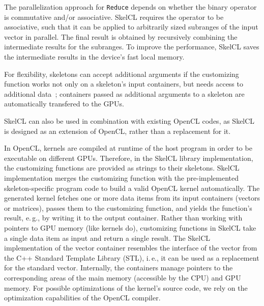 %
%
%


The parallelization approach for \texttt{Reduce} depends on whether the binary operator is commutative and/or associative.
SkelCL requires the operator to be associative, such that it can be applied to arbitrarily sized subranges of the input vector in parallel.
The final result is obtained by recursively combining the intermediate results for the subranges.
To improve the performance, SkelCL saves the intermediate results in the device's fast local memory.


For flexibility, \SkelCL skeletons can accept additional arguments if the customizing function works not only on a skeleton's input containers, but needs access to additional data~\cite{StKG-11};
containers passed as additional arguments to a skeleton are automatically transfered to the GPUs.

SkelCL can also be used in combination with existing OpenCL codes, as SkelCL is designed as an extension of OpenCL, rather than a replacement for it.


In OpenCL, kernels are compiled at runtime of the host program in order to be executable on different GPUs.
Therefore, in the SkelCL library implementation, the customizing functions are provided as strings to their skeletons.
SkelCL implementation merges the customizing function with the pre-implemented skeleton-specific program code to build a valid OpenCL kernel automatically.
The generated kernel fetches one or more data items from its input containers (vectors or matrices), passes them to the customizing function, and yields the function's result, e.\,g., by writing it to the output container.
Rather than working with pointers to GPU memory (like kernels do), customizing functions in SkelCL take a single data item as input and return a single result.
The SkelCL implementation of the vector container resembles the interface of the vector from the C++ Standard Template Library (STL), i.\,e., it can be used as a replacement for the standard vector.
Internally, the containers manage pointers to the corresponding areas of the main memory (accessible by the CPU) and GPU memory.
For possible optimizations of the kernel's source code, we rely on the optimization capabilities of the OpenCL compiler.

